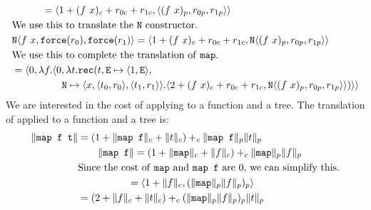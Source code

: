 \begin{align*}
              &\qquad\quad = \langle 1 + (f\ x)_c + r_{0c} + r_{1c},\langle (f\ x)_p, r_{0p}, r_{1p}\rangle\rangle\\
              &\text{We use this to translate the \texttt{N} constructor.} \\
              &\texttt{N}\langle f\ x,\texttt{force}(r_0),\texttt{force}(r_1)\rangle = \langle 1 + (f\ x)_c + r_{0c} + r_{1c}, \texttt{N}\langle(f\ x)_p,r_{0p},r_{1p}\rangle\rangle \\
              &\text{We use this to complete the translation of \texttt{map}.} \\
              &= \langle 0,\lambda f.\langle 0,\lambda t.\texttt{rec}(t, \texttt{E} \mapsto \langle 1,\texttt{E}\rangle,\\
              &\qquad\quad\quad\quad \texttt{N} \mapsto \langle x,\langle t_0,r_0\rangle,\langle t_1,r_1\rangle\rangle.\langle 2 + (f\ x)_c + r_{0c} + r_{1c}, \texttt{N}\langle (f\ x)_p,r_{0p},r_{1p}\rangle\rangle)\rangle\rangle \\
\end{align*}
%
We are interested in the cost of applying  to a function and a tree.
The translation of  applied to a function  and a tree  is:
%
\begin{align*}
  \|\texttt{map f t}\| &= (1 + \|\texttt{map f}\|_c + \|t\|_c) +_c \|\texttt{map f}\|_p \|t\|_p \\
                  &\qquad \|\texttt{map f}\| = (1 + \|\texttt{map}\|_c + \|f\|_c) +_c \|\texttt{map}\|_p \|f\|_p \\
                  &\text{Since the cost of \texttt{map} and \texttt{map f} are $0$, we can simplify this.} \\
                  &\qquad\quad\quad\quad = \langle 1 + \|f\|_c, (\|\texttt{map}\|_p \|f\|_p)_p \rangle \\
                  &= (2 + \|f\|_c + \|t\|_c) +_c (\|\texttt{map}\|_p \|f\|_p)_p \|t\|_p
\end{align*}
%

